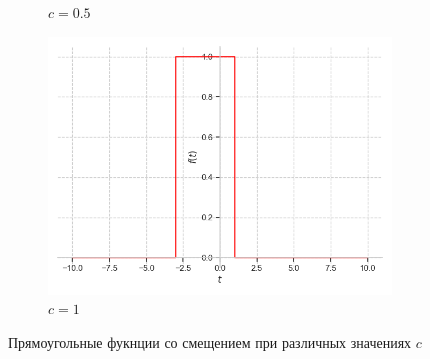 \documentclass[a4paper, 16pt]{article}
\begin{document}
\begin{figure}[htbp]
\begin{subfigure}{0.3\textwidth}
            \caption{$c=0.5$}
            \label{fig:shrectf_2}
        \end{subfigure}
        \hfill
        \begin{subfigure}{0.3\textwidth}
            \centering
            \includegraphics[width=\linewidth]{sh_1_rectf_int12.png}
            \caption{$c=1$}
            \label{fig:shrectf_3}
        \end{subfigure}
        \caption{Прямоугольные фукнции со смещением при различных значениях $c$}
        \label{fig:shrectfs}
    \end{figure}
\end{document}
